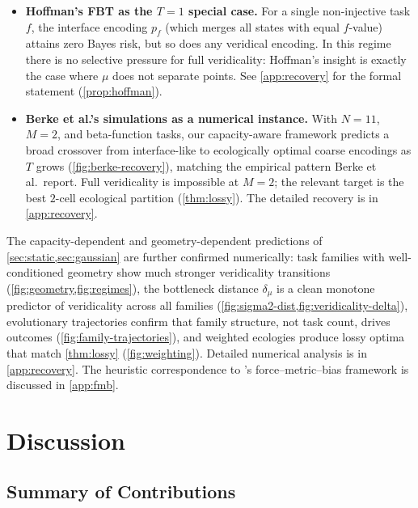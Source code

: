 \documentclass[12pt]{article}
\newcommand{\dmu}{\delta_\mu}
\begin{document}
\begin{itemize}
\item \textbf{Hoffman's FBT as the $T=1$ special case.} For a single non-injective task $f$, the interface encoding $p_f$ (which merges all states with equal $f$-value) attains zero Bayes risk, but so does any veridical encoding. In this regime there is no selective pressure for full veridicality: Hoffman's insight is exactly the case where $\mu$ does not separate points. See \cref{app:recovery} for the formal statement (\cref{prop:hoffman}).

\item \textbf{Berke et al.'s simulations as a numerical instance.} With $N = 11$, $M = 2$, and beta-function tasks, our capacity-aware framework predicts a broad crossover from interface-like to ecologically optimal coarse encodings as $T$ grows (\cref{fig:berke-recovery}), matching the empirical pattern Berke et al.\ report. Full veridicality is impossible at $M = 2$; the relevant target is the best $2$-cell ecological partition (\cref{thm:lossy}). The detailed recovery is in \cref{app:recovery}.
\end{itemize}

The capacity-dependent and geometry-dependent predictions of \cref{sec:static,sec:gaussian} are further confirmed numerically: task families with well-conditioned geometry show much stronger veridicality transitions (\cref{fig:geometry,fig:regimes}), the bottleneck distance $\dmu$ is a clean monotone predictor of veridicality across all families (\cref{fig:sigma2-dist,fig:veridicality-delta}), evolutionary trajectories confirm that family structure, not task count, drives outcomes (\cref{fig:family-trajectories}), and weighted ecologies produce lossy optima that match \cref{thm:lossy} (\cref{fig:weighting}). Detailed numerical analysis is in \cref{app:recovery}. The heuristic correspondence to \citet{frank_2025}'s force--metric--bias framework is discussed in \cref{app:fmb}.

\section{Discussion}\label{sec:discussion}

\subsection{Summary of Contributions}\label{sec:summary}
\end{document}
